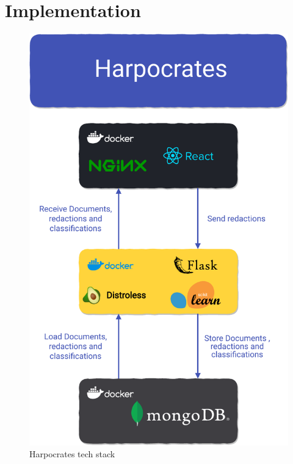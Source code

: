 \documentclass[\version]{l4proj}
\begin{document}



\chapter{Implementation}

\begin{figure}
    \includegraphics[width=\linewidth]{figures/tech_stack_no_background.pdf}
    \caption{Harpocrates tech stack}\label{fig:tech_stack}
    \vspace{-50pt}
\end{figure}
\end{document}
